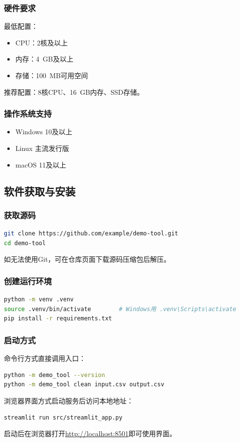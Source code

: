 \subsubsection{硬件要求}
最低配置：
\begin{itemize}
    \item CPU：2核及以上
    \item 内存：4~GB及以上
    \item 存储：100~MB可用空间
\end{itemize}
推荐配置：8核CPU、16~GB内存、SSD存储。

\subsubsection{操作系统支持}
\begin{itemize}
    \item Windows 10及以上
    \item Linux 主流发行版
    \item macOS 11及以上
\end{itemize}

\subsection{软件获取与安装}
\label{ssec:install}

\subsubsection{获取源码}
\begin{lstlisting}[language=bash,style=blockstyle]
git clone https://github.com/example/demo-tool.git
cd demo-tool
\end{lstlisting}
如无法使用Git，可在仓库页面下载源码压缩包后解压。

\subsubsection{创建运行环境}
\begin{lstlisting}[language=bash,style=blockstyle]
python -m venv .venv
source .venv/bin/activate        # Windows用 .venv\Scripts\activate
pip install -r requirements.txt
\end{lstlisting}

\subsubsection{启动方式}
命令行方式直接调用入口：
\begin{lstlisting}[language=bash,style=blockstyle]
python -m demo_tool --version
python -m demo_tool clean input.csv output.csv
\end{lstlisting}
浏览器界面方式启动服务后访问本地地址：
\begin{lstlisting}[language=bash,style=blockstyle]
streamlit run src/streamlit_app.py
\end{lstlisting}
启动后在浏览器打开\url{http://localhost:8501}即可使用界面。

